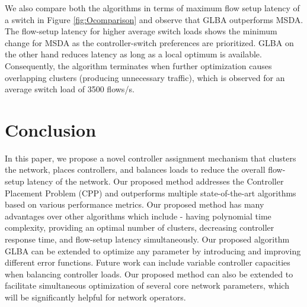 \documentclass[a4paper,fleqn]{cas-dc}
\begin{document}
We also compare both the algorithms in terms of maximum flow setup latency of a switch in Figure \ref{fig:Ocomparison} and observe that GLBA outperforms MSDA. The flow-setup latency for higher average switch loads shows the minimum change for MSDA as the controller-switch preferences are prioritized. GLBA on the other hand reduces latency as long as a local optimum is available. Consequently, the algorithm terminates when further optimization causes overlapping clusters (producing unnecessary traffic), which is observed for an average switch load of 3500 flows/s.

\section{Conclusion} \label{conclusion}

\noindent In this paper, we propose a novel controller assignment mechanism that clusters the network, places controllers, and balances loads to reduce the overall flow-setup latency of the network. Our proposed method addresses the Controller Placement Problem (CPP) and outperforms multiple state-of-the-art algorithms based on various performance metrics. Our proposed method has many advantages over other algorithms which include - having polynomial time complexity, providing an optimal number of clusters, decreasing controller response time, and flow-setup latency simultaneously. Our proposed algorithm GLBA can be extended to optimize any parameter by introducing and improving different error functions. Future work can include variable controller capacities when balancing controller loads. Our proposed method can also be extended to facilitate simultaneous optimization of several core network parameters, which will be significantly helpful for network operators.

%



\end{document}
